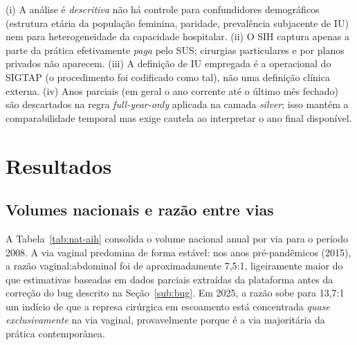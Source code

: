 \documentclass[12pt,a4paper,oneside]{article}
\begin{document}
(i) A análise é \textit{descritiva} \textemdash{} não há controle
para confundidores demográficos (estrutura etária da população
feminina, paridade, prevalência subjacente de IU) nem para
heterogeneidade da capacidade hospitalar. (ii) O SIH captura
apenas a parte da prática efetivamente \textit{paga} pelo SUS;
cirurgias particulares e por planos privados não aparecem.
(iii) A definição de IU empregada é a operacional do SIGTAP
(o procedimento foi codificado como tal), não uma definição
clínica externa. (iv) Anos parciais (em geral o ano corrente até
o último mês fechado) são descartados na regra
\textit{full-year-only} aplicada na camada \textit{silver}; isso
mantém a comparabilidade temporal mas exige cautela ao interpretar
o ano final disponível.

\section{Resultados}\label{sec:resultados}

\subsection{Volumes nacionais e razão entre vias}\label{sub:volumes}

A Tabela~\ref{tab:nat-aih} consolida o volume nacional anual por
via para o período 2008. A via vaginal predomina
de forma estável: nos anos pré-pandêmicos (2015),
a razão vaginal:abdominal foi de aproximadamente 7{,}5:1,
ligeiramente maior do que estimativas baseadas em dados parciais
extraídas da plataforma antes da correção do bug descrito na
Seção~\ref{sub:bug}. Em 2025, a razão sobe para 13{,}7:1
\textemdash{} um indício de que a represa cirúrgica em escoamento
está concentrada \textit{quase exclusivamente} na via vaginal,
provavelmente porque é a via majoritária da prática contemporânea.
\end{document}
